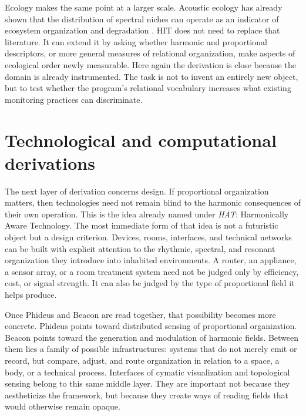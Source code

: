 Ecology makes the same point at a larger scale. Acoustic ecology has already shown that the distribution of spectral niches can operate as an indicator of ecosystem organization and degradation \parencite{krause_2013}. HIT does not need to replace that literature. It can extend it by asking whether harmonic and proportional descriptors, or more general measures of relational organization, make aspects of ecological order newly measurable. Here again the derivation is close because the domain is already instrumented. The task is not to invent an entirely new object, but to test whether the program's relational vocabulary increases what existing monitoring practices can discriminate.


\section{Technological and computational derivations}


The next layer of derivation concerns design. If proportional organization matters, then technologies need not remain blind to the harmonic consequences of their own operation. This is the idea already named under \emph{HAT}: Harmonically Aware Technology. The most immediate form of that idea is not a futuristic object but a design criterion. Devices, rooms, interfaces, and technical networks can be built with explicit attention to the rhythmic, spectral, and resonant organization they introduce into inhabited environments. A router, an appliance, a sensor array, or a room treatment system need not be judged only by efficiency, cost, or signal strength. It can also be judged by the type of proportional field it helps produce.

Once Phideus and Beacon are read together, that possibility becomes more concrete. Phideus points toward distributed sensing of proportional organization. Beacon points toward the generation and modulation of harmonic fields. Between them lies a family of possible infrastructures: systems that do not merely emit or record, but compare, adjust, and route organization in relation to a space, a body, or a technical process. Interfaces of cymatic visualization and topological sensing belong to this same middle layer. They are important not because they aestheticize the framework, but because they create ways of reading fields that would otherwise remain opaque.

